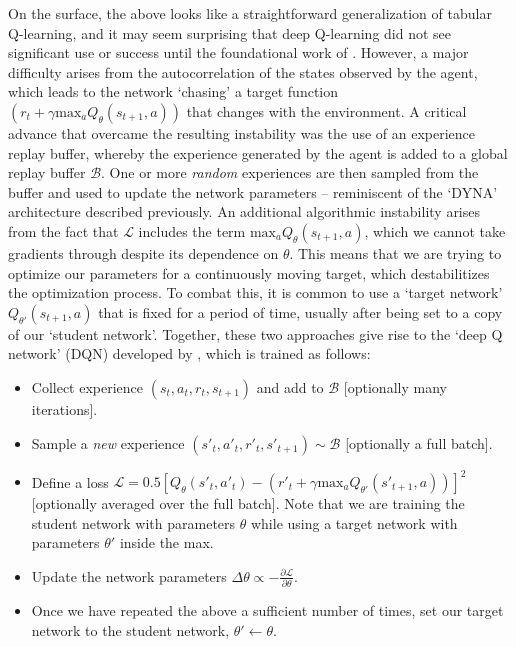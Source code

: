 On the surface, the above looks like a straightforward generalization of tabular Q-learning, and it may seem surprising that deep Q-learning did not see significant use or success until the foundational work of \citet{mnih2013playing}.
However, a major difficulty arises from the autocorrelation of the states observed by the agent, which leads to the network `chasing' a target function $(r_t + \gamma \text{max}_a Q_\theta(s_{t+1}, a))$ that changes with the environment.
A critical advance that overcame the resulting instability was the use of an experience replay buffer, whereby the experience generated by the agent is added to a global replay buffer $\mathcal{B}$.
One or more \emph{random} experiences are then sampled from the buffer and used to update the network parameters -- reminiscent of the `DYNA' architecture described previously.
An additional algorithmic instability arises from the fact that $\mathcal{L}$ includes the term $\text{max}_a Q_\theta(s_{t+1}, a)$, which we cannot take gradients through despite its dependence on $\theta$.
This means that we are trying to optimize our parameters for a continuously moving target, which destabilitizes the optimization process.
To combat this, it is common to use a `target network' $Q_{\theta'}(s_{t+1}, a)$ that is fixed for a period of time, usually after being set to a copy of our `student network'.
Together, these two approaches give rise to the `deep Q network' (DQN) developed by \citet{mnih2013playing}, which is trained as follows:
\begin{itemize}
    \item Collect experience $(s_t, a_t, r_t, s_{t+1})$ and add to $\mathcal{B}$ [optionally many iterations].
    \item Sample a \emph{new} experience $(s'_t, a'_t, r'_t, s'_{t+1}) \sim \mathcal{B}$ [optionally a full batch].
    \item Define a loss $\mathcal{L} = 0.5 [ Q_\theta(s'_t, a'_t) - (r'_t + \gamma \text{max}_a Q_{\theta'}(s'_{t+1}, a)) ]^2 $ [optionally averaged over the full batch]. Note that we are training the student network with parameters $\theta$ while using a target network with parameters $\theta'$ inside the max.
    \item Update the network parameters $\Delta \theta \propto - \frac{\partial \mathcal{L}}{\partial \theta}$.
    \item Once we have repeated the above a sufficient number of times, set our target network to the student network, $\theta' \leftarrow \theta$.
\end{itemize}
